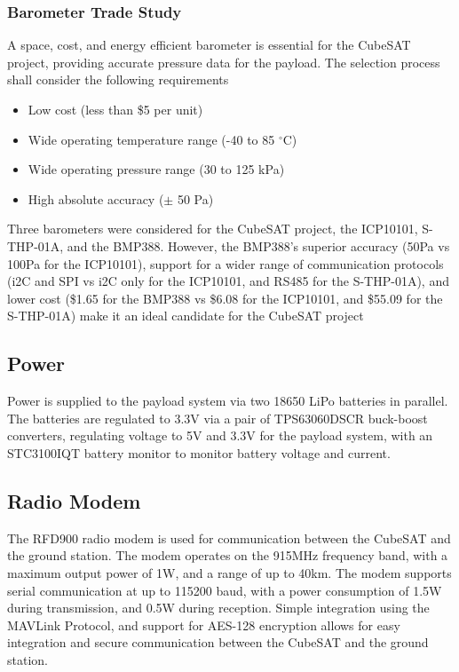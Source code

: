 \documentclass{report}
\begin{document}
                \subsubsection{Barometer Trade Study}
                    A space, cost, and energy efficient barometer is essential for the CubeSAT project,
                    providing accurate pressure data for the payload. The selection process shall consider
                    the following requirements
                    \begin{itemize}
                        \item Low cost (less than \$5 per unit)
                        \item Wide operating temperature range (-40 to 85 $^\circ$C)
                        \item Wide operating pressure range (30 to 125 kPa)
                        \item High absolute accuracy ($\pm$ 50 Pa)
                    \end{itemize}
                    Three barometers were considered for the CubeSAT project, the ICP10101, S-THP-01A, and
                    the BMP388. However, the BMP388's superior accuracy (50Pa vs 100Pa for the ICP10101),
                    support for a wider range of communication protocols (i2C and SPI vs i2C only for the ICP10101, and 
                    RS485 for the S-THP-01A), and lower cost (\$1.65 for the BMP388 vs \$6.08 for the ICP10101, and \$55.09 for the S-THP-01A)
                    make it an ideal candidate for the CubeSAT project \cite{bmpdatasheet}
            \subsection{Power}
                Power is supplied to the payload system via two 18650 LiPo batteries in parallel.
                The batteries are regulated to 3.3V via a pair of TPS63060DSCR buck-boost converters, regulating
                voltage to 5V and 3.3V for the payload system, with an STC3100IQT battery monitor to monitor battery
                voltage and current.
            \subsection{Radio Modem}
                The RFD900 radio modem is used for communication between the CubeSAT and the ground station.
                The modem operates on the 915MHz frequency band, with a maximum output power of 1W, and a range of up to 40km.
                The modem supports serial communication at up to 115200 baud, with a power consumption of 1.5W during transmission,
                and 0.5W during reception.
                Simple integration using the MAVLink Protocol, and 
                support for AES-128 encryption allows for easy integration and secure communication between the CubeSAT and the ground station.
\end{document}
